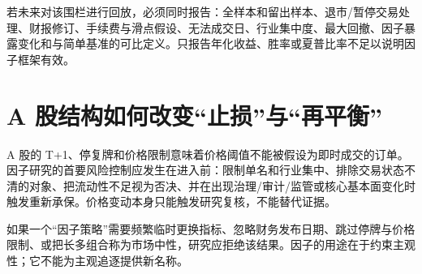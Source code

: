 若未来对该围栏进行回放，必须同时报告：全样本和留出样本、退市/暂停交易处理、财报修订、手续费与滑点假设、无法成交日、行业集中度、最大回撤、因子暴露变化和与简单基准的可比定义。只报告年化收益、胜率或夏普比率不足以说明因子框架有效。

\section{A 股结构如何改变“止损”与“再平衡”}

A 股的 T+1、停复牌和价格限制意味着价格阈值不能被假设为即时成交的订单。因子研究的首要风险控制应发生在进入前：限制单名和行业集中、排除交易状态不清的对象、把流动性不足视为否决、并在出现治理/审计/监管或核心基本面变化时触发重新承保。价格变动本身只能触发研究复核，不能替代证据。

\begin{riskbox}[因子框架的反直觉结论]
如果一个“因子策略”需要频繁临时更换指标、忽略财务发布日期、跳过停牌与价格限制、或把长多组合称为市场中性，研究应拒绝该结果。因子的用途在于约束主观性；它不能为主观追逐提供新名称。
\end{riskbox}
